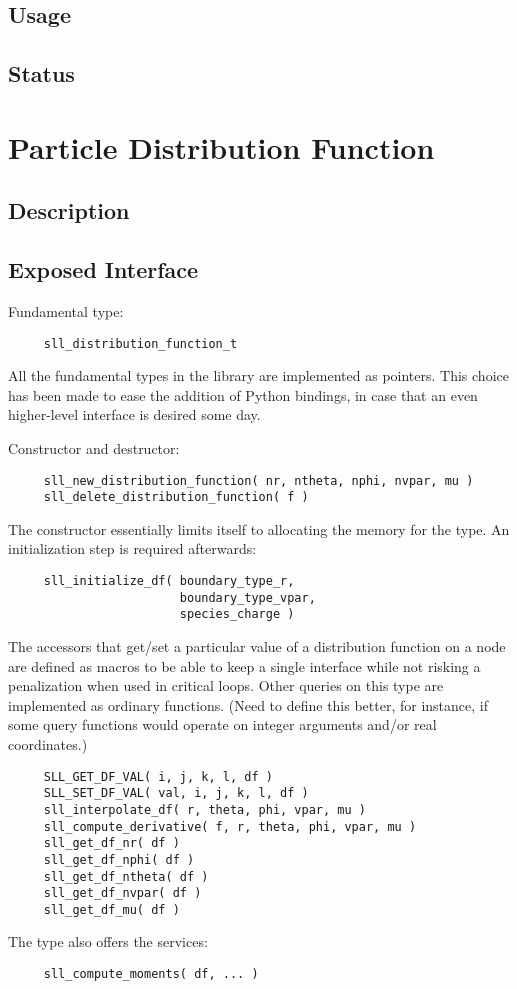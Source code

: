 \documentclass[]{report}   %
\begin{document}
\subsection{Usage}
\subsection{Status}


\section{Particle Distribution Function}
\subsection{Description}
\subsection{Exposed Interface}
Fundamental type:
\begin{verbatim}
     sll_distribution_function_t
\end{verbatim}
All the fundamental types in the library are implemented as pointers. This choice has been made to ease the addition of Python bindings, in case that an even higher-level interface is desired some day.

Constructor and destructor:
\begin{verbatim}
     sll_new_distribution_function( nr, ntheta, nphi, nvpar, mu )
     sll_delete_distribution_function( f )
\end{verbatim}
The constructor essentially limits itself to allocating the memory for the type. An initialization step is required afterwards:
\begin{verbatim}
     sll_initialize_df( boundary_type_r, 
                        boundary_type_vpar, 
                        species_charge )
\end{verbatim}
The accessors that get/set a particular value of a distribution function on a node are defined as macros to be able to keep a single interface while not risking a penalization when used in critical loops. Other queries on this type are implemented as ordinary functions. (Need to define this better, for instance, if some query functions would operate on integer arguments and/or real coordinates.)
\begin{verbatim}
     SLL_GET_DF_VAL( i, j, k, l, df )
     SLL_SET_DF_VAL( val, i, j, k, l, df )
     sll_interpolate_df( r, theta, phi, vpar, mu )
     sll_compute_derivative( f, r, theta, phi, vpar, mu )
     sll_get_df_nr( df )
     sll_get_df_nphi( df )
     sll_get_df_ntheta( df )
     sll_get_df_nvpar( df )
     sll_get_df_mu( df )
\end{verbatim}
The type also offers the services:
\begin{verbatim}
     sll_compute_moments( df, ... )
\end{verbatim}
\end{document}
